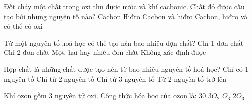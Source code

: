 \begin{ex}
	Đốt cháy một chất trong oxi thu được nước và khí cacbonic. Chất đó được cấu tạo bởi những nguyên tố nào?
	\choice
	{Cacbon}
	{Hiđro}
	{Cacbon và hiđro}
	{\True Cacbon, hiđro và có thể có oxi}
	\loigiai{
		
	}
\end{ex}

\begin{ex}
	Từ một nguyên tố hoá học có thể tạo nên bao nhiêu đợn chất?
	\choice
	{Chỉ 1 đơn chất}
	{Chỉ 2 đơn chất}
	{\True Một, hai hay nhiều đơn chất}
	{Không xác định được}
	\loigiai{}
\end{ex}

\begin{ex}
	Hợp chất là những chất được tạo nên từ bao nhiêu nguyên tố hoá học?
	\choice
	{Chỉ có 1 nguyên tố}
	{Chỉ từ 2 nguyên tố}
	{Chỉ từ 3 nguyên tố}
	{\True Từ 2 nguyên tố trở lên}
	\loigiai{}
\end{ex}

\begin{ex}
	Khí ozon gồm 3 nguyên tử oxi. Công thức hóa học của ozon là:
	\choice
	{$30$}
	{$3O_2$}
	{\True $O_3$}
	{$2O_3$}
	\loigiai{}
\end{ex}


